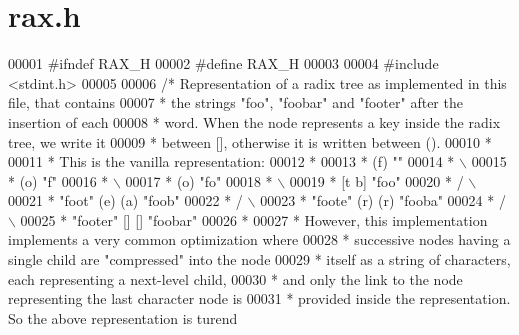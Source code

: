 \hypertarget{rax_8h_source}{}\section{rax.\+h}
\label{rax_8h_source}

\begin{DoxyCode}
00001 \textcolor{preprocessor}{#}\textcolor{preprocessor}{ifndef} \textcolor{preprocessor}{RAX\_H}
00002 \textcolor{preprocessor}{#}\textcolor{preprocessor}{define} \textcolor{preprocessor}{RAX\_H}
00003 
00004 \textcolor{preprocessor}{#}\textcolor{preprocessor}{include} \textcolor{preprocessor}{<}\textcolor{preprocessor}{stdint}\textcolor{preprocessor}{.}\textcolor{preprocessor}{h}\textcolor{preprocessor}{>}
00005 
00006 \textcolor{comment}{/* Representation of a radix tree as implemented in this file, that contains}
00007 \textcolor{comment}{ * the strings "foo", "foobar" and "footer" after the insertion of each}
00008 \textcolor{comment}{ * word. When the node represents a key inside the radix tree, we write it}
00009 \textcolor{comment}{ * between [], otherwise it is written between ().}
00010 \textcolor{comment}{ *}
00011 \textcolor{comment}{ * This is the vanilla representation:}
00012 \textcolor{comment}{ *}
00013 \textcolor{comment}{ *              (f) ""}
00014 \textcolor{comment}{ *                \(\backslash\)}
00015 \textcolor{comment}{ *                (o) "f"}
00016 \textcolor{comment}{ *                  \(\backslash\)}
00017 \textcolor{comment}{ *                  (o) "fo"}
00018 \textcolor{comment}{ *                    \(\backslash\)}
00019 \textcolor{comment}{ *                  [t   b] "foo"}
00020 \textcolor{comment}{ *                  /     \(\backslash\)}
00021 \textcolor{comment}{ *         "foot" (e)     (a) "foob"}
00022 \textcolor{comment}{ *                /         \(\backslash\)}
00023 \textcolor{comment}{ *      "foote" (r)         (r) "fooba"}
00024 \textcolor{comment}{ *              /             \(\backslash\)}
00025 \textcolor{comment}{ *    "footer" []             [] "foobar"}
00026 \textcolor{comment}{ *}
00027 \textcolor{comment}{ * However, this implementation implements a very common optimization where}
00028 \textcolor{comment}{ * successive nodes having a single child are "compressed" into the node}
00029 \textcolor{comment}{ * itself as a string of characters, each representing a next-level child,}
00030 \textcolor{comment}{ * and only the link to the node representing the last character node is}
00031 \textcolor{comment}{ * provided inside the representation. So the above representation is turend}

\end{DoxyCode}
